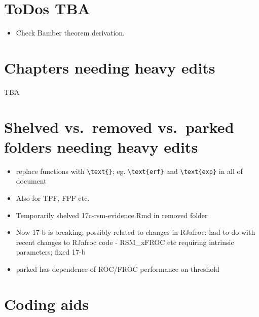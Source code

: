 \documentclass[
]{book}
\providecommand{\tightlist}{%
  \setlength{\itemsep}{0pt}\setlength{\parskip}{0pt}}
\begin{document}
\hypertarget{todos-tba}{%
\section*{ToDos TBA}\label{todos-tba}}

\begin{itemize}
\tightlist
\item
  Check Bamber theorem derivation.
\end{itemize}

\hypertarget{chapters-needing-heavy-edits}{%
\section*{Chapters needing heavy edits}\label{chapters-needing-heavy-edits}}

TBA

\hypertarget{shelved-vs.-removed-vs.-parked-folders-needing-heavy-edits}{%
\section*{Shelved vs.~removed vs.~parked folders needing heavy edits}\label{shelved-vs.-removed-vs.-parked-folders-needing-heavy-edits}}

\begin{itemize}
\tightlist
\item
  replace functions with \texttt{\textbackslash{}text\{\}}; eg. \texttt{\textbackslash{}text\{erf\}} and \texttt{\textbackslash{}text\{exp\}} in all of document
\item
  Also for TPF, FPF etc.
\item
  Temporarily shelved 17c-rsm-evidence.Rmd in removed folder
\item
  Now 17-b is breaking; possibly related to changes in RJafroc: had to do with recent changes to RJafroc code - RSM\_xFROC etc requiring intrinsic parameters; fixed 17-b
\item
  parked has dependence of ROC/FROC performance on threshold
\end{itemize}

\hypertarget{coding-aids}{%
\section*{Coding aids}\label{coding-aids}}
\end{document}
